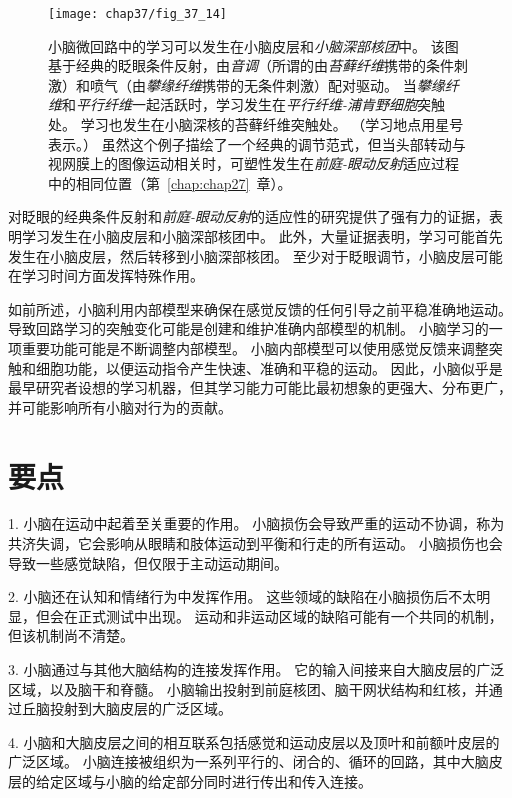 \begin{figure}[htbp]
	\centering
	\texttt{[image: chap37/fig\_37\_14]}
	\caption{小脑微回路中的学习可以发生在小脑皮层和\textit{小脑深部核团}中。
		该图基于经典的眨眼条件反射，由\textit{音调}（所谓的由\textit{苔藓纤维}携带的条件刺激）和喷气（由\textit{攀缘纤维}携带的无条件刺激）配对驱动。
		当\textit{攀缘纤维}和\textit{平行纤维}一起活跃时，学习发生在\textit{平行纤维-浦肯野细胞}突触处。
		学习也发生在小脑深核的苔藓纤维突触处。
		（学习地点用星号表示。）
		虽然这个例子描绘了一个经典的调节范式，但当头部转动与视网膜上的图像运动相关时，可塑性发生在\textit{前庭-眼动反射}适应过程中的相同位置（第~\ref{chap:chap27}~章）\cite{carey2002embarrassed}。}
	\label{fig:37_14}
\end{figure}


对眨眼的经典条件反射和\textit{前庭-眼动反射}的适应性的研究提供了强有力的证据，表明学习发生在小脑皮层和小脑深部核团中。
此外，大量证据表明，学习可能首先发生在小脑皮层，然后转移到小脑深部核团。
至少对于眨眼调节，小脑皮层可能在学习时间方面发挥特殊作用。


如前所述，小脑利用内部模型来确保在感觉反馈的任何引导之前平稳准确地运动。
导致回路学习的突触变化可能是创建和维护准确内部模型的机制。
小脑学习的一项重要功能可能是不断调整内部模型。
小脑内部模型可以使用感觉反馈来调整突触和细胞功能，以便运动指令产生快速、准确和平稳的运动。
因此，小脑似乎是最早研究者设想的学习机器，但其学习能力可能比最初想象的更强大、分布更广，并可能影响所有小脑对行为的贡献。



\section{要点}

1. 小脑在运动中起着至关重要的作用。
小脑损伤会导致严重的运动不协调，称为共济失调，它会影响从眼睛和肢体运动到平衡和行走的所有运动。
小脑损伤也会导致一些感觉缺陷，但仅限于主动运动期间。


2. 小脑还在认知和情绪行为中发挥作用。
这些领域的缺陷在小脑损伤后不太明显，但会在正式测试中出现。
运动和非运动区域的缺陷可能有一个共同的机制，但该机制尚不清楚。


3. 小脑通过与其他大脑结构的连接发挥作用。
它的输入间接来自大脑皮层的广泛区域，以及脑干和脊髓。
小脑输出投射到前庭核团、脑干网状结构和红核，并通过丘脑投射到大脑皮层的广泛区域。


4. 小脑和大脑皮层之间的相互联系包括感觉和运动皮层以及顶叶和前额叶皮层的广泛区域。
小脑连接被组织为一系列平行的、闭合的、循环的回路，其中大脑皮层的给定区域与小脑的给定部分同时进行传出和传入连接。


